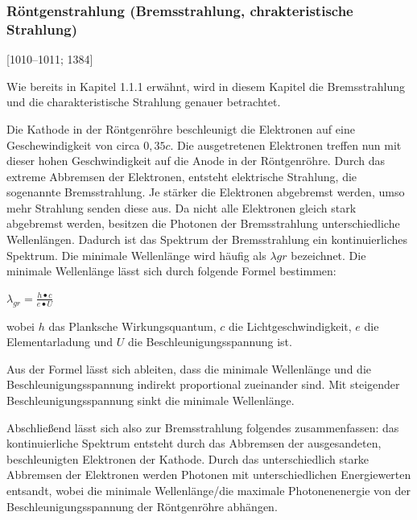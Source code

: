\documentclass{article}
\begin{document}
    \subsubsection{Röntgenstrahlung (Bremsstrahlung, chrakteristische Strahlung)}

    \cite{Physik} [1010--1011; 1384]
    \cite{leifiphysik_B}
    \cite{leifiphysik_C}

    Wie bereits in Kapitel 1.1.1 erwähnt, wird in diesem Kapitel die Bremsstrahlung und die charakteristische Strahlung genauer betrachtet.
    
    Die Kathode in der Röntgenröhre beschleunigt die Elektronen auf eine Geschewindigkeit von circa $0,35c$. Die ausgetretenen Elektronen treffen nun mit dieser hohen Geschwindigkeit auf die Anode in der Röntgenröhre. Durch das extreme Abbremsen der Elektronen, entsteht elektrische Strahlung, die sogenannte Bremsstrahlung. Je stärker die Elektronen abgebremst werden, umso mehr Strahlung senden diese aus. Da nicht alle Elektronen gleich stark abgebremst werden, besitzen die Photonen der Bremsstrahlung unterschiedliche Wellenlängen. Dadurch ist das Spektrum der Bremsstrahlung ein kontinuierliches Spektrum. Die minimale Wellenlänge wird häufig als $\lambda{gr}$ bezeichnet. Die minimale Wellenlänge lässt sich durch folgende Formel bestimmen:
    \begin{center}
        $\lambda_{gr}=\frac{h•c}{e•U}$
    \end{center}
    wobei $h$ das Planksche Wirkungsquantum, $c$ die Lichtgeschwindigkeit, $e$ die Elementarladung und $U$ die Beschleunigungsspannung ist.

    Aus der Formel lässt sich ableiten, dass die minimale Wellenlänge und die Beschleunigungsspannung indirekt proportional zueinander sind. Mit steigender Beschleunigungsspannung sinkt die minimale Wellenlänge.

    Abschließend lässt sich also zur Bremsstrahlung folgendes zusammenfassen: das kontinuierliche Spektrum entsteht durch das Abbremsen der ausgesandeten, beschleunigten Elektronen der Kathode. Durch das unterschiedlich starke Abbremsen der Elektronen werden Photonen mit unterschiedlichen Energiewerten entsandt, wobei die minimale Wellenlänge/die maximale Photonenenergie von der Beschleunigungsspannung der Röntgenröhre abhängen.
\end{document}

